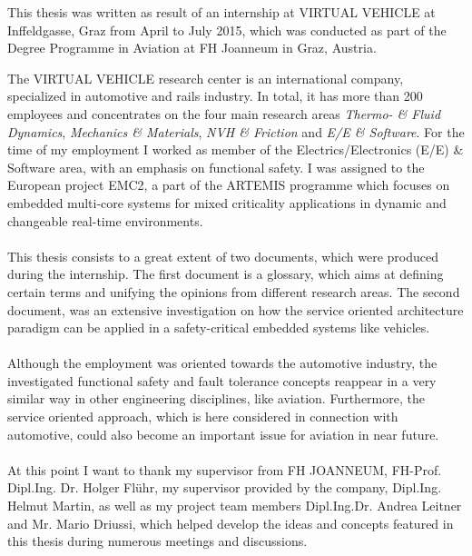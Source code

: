 This thesis was written as result of an internship at VIRTUAL VEHICLE at Inffeldgasse, Graz from April to July 2015, which was conducted as part of the Degree Programme in Aviation at FH Joanneum in Graz, Austria.

The VIRTUAL VEHICLE research center is an international company, specialized in automotive and rails industry. In total, it has more than 200 employees and concentrates on the four main research areas \emph{Thermo- \& Fluid Dynamics}, \emph{Mechanics \& Materials}, \emph{NVH \& Friction} and \emph{E/E \& Software}. For the time of my employment I worked as member of the Electrics/Electronics (E/E) \& Software area, with an emphasis on functional safety. I was assigned to the European project EMC2, a part of the ARTEMIS programme which focuses on embedded multi-core systems for mixed criticality applications in dynamic and changeable real-time environments. 
\\
\\
This thesis consists to a great extent of two documents, which were produced during the internship. The first document is a glossary, which aims at defining certain terms and unifying the opinions from different research areas. The second document, was an extensive investigation on how the service oriented architecture paradigm can be applied in a safety-critical embedded systems like vehicles.
\\
\\
Although the employment was oriented towards the automotive industry, the investigated functional safety and fault tolerance concepts reappear in a very similar way in other engineering disciplines, like aviation. Furthermore, the service oriented approach, which is here considered in connection with automotive, could also become an important issue for aviation in near future.
\\
\\
At this point I want to thank my supervisor from FH JOANNEUM, FH-Prof. Dipl.Ing. Dr. Holger Flühr, my supervisor provided by the company, Dipl.Ing. Helmut Martin, as well as my project team members Dipl.Ing.Dr. Andrea Leitner and Mr. Mario Driussi, which helped develop the ideas and concepts featured in this thesis during numerous meetings and discussions.